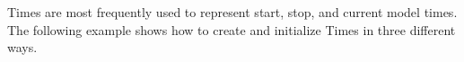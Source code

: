 
Times are most frequently used to represent start, stop, and current 
model times.  The following example shows how to create and initialize 
Times in three different ways.


